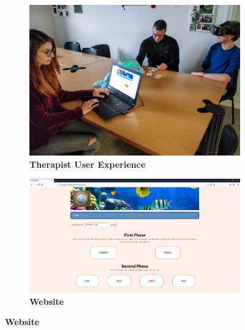 \documentclass [12pt]{article}
\begin{document}
\begin{figure}[h!]
\centering
\hspace*{\fill}
\begin{subfigure}[tl]{0.3\linewidth}
\includegraphics[width=\linewidth]{TherapistUserExperience.jpg}
\caption{\textbf{Therapist User Experience}}
\end{subfigure}\hfill
\begin{subfigure}[tr]{0.3\linewidth}
\includegraphics[width=\linewidth]{Website.jpg}
\caption{\textbf{Website}}
\end{subfigure}
\hspace*{\fill}
\end{figure}
\end{document}
